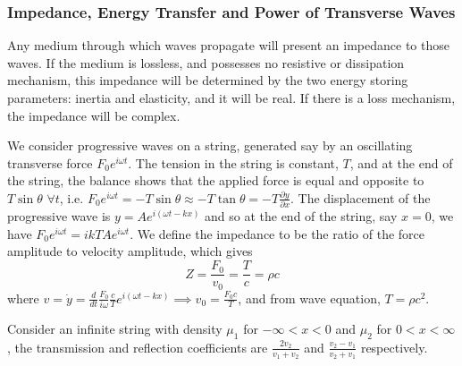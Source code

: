\documentclass[a4paper]{article}
\begin{document}
\subsubsection*{Impedance, Energy Transfer and Power of Transverse Waves}
\begin{defi}
Any medium through which waves propagate will present an impedance to those waves. If the medium is lossless, and possesses no resistive or dissipation mechanism, this impedance will be determined by the two energy storing parameters: inertia and elasticity, and it will be real. If there is a loss mechanism, the impedance will be complex.
\end{defi}
\begin{note}
We consider progressive waves on a string, generated say by an oscillating transverse force $F_0e^{i\omega t}$. The tension in the string is constant, $T$, and at the end of the string, the balance shows that the applied force is equal and opposite to $T\sin\theta$ $\forall t$, i.e. $F_0e^{i\omega t}=-T\sin\theta\approx -T\tan\theta=-T\frac{\partial y}{\partial x}$. The displacement of the progressive wave is $y=Ae^{i(\omega t-kx)}$ and so at the end of the string, say $x=0$, we have $F_0e^{i\omega t}=ikTAe^{i\omega t}$. We define the impedance to be the ratio of the force amplitude to velocity amplitude, which gives
$$Z=\frac{F_0}{v_0}=\frac{T}{c}=\rho c$$
where $v=\dot{y}=\frac{d}{dt}\frac{F_0}{i\omega}\frac{c}{T}e^{i(\omega t-kx)}\implies v_0=\frac{F_0c}{T}$, and from wave equation, $T=\rho c^2$.
\end{note}
\begin{thm}
Consider an infinite string with density $\mu_1$ for $-\infty<x<0$ and $\mu_2$ for $0<x<\infty$, the transmission and reflection coefficients are $\frac{2v_2}{v_1+v_2}$ and $\frac{v_2-v_1}{v_2+v_1}$ respectively.
\end{thm}
\end{document}
